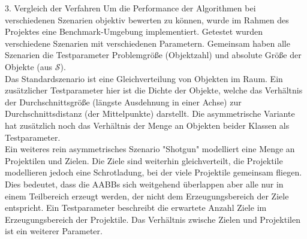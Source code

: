 3. Vergleich der Verfahren
Um die Performance der Algorithmen bei verschiedenen Szenarien objektiv bewerten zu können, wurde im Rahmen des Projektes eine Benchmark-Umgebung implementiert. Getestet wurden verschiedene Szenarien mit verschiedenen Parametern. Gemeinsam haben alle Szenarien die Testparameter Problemgröße (Objektzahl) und absolute Größe der Objekte (aus $\mathcal{S}$).\\
Das Standardszenario ist eine Gleichverteilung von Objekten im Raum. Ein zusätzlicher Testparameter hier ist die Dichte der Objekte, welche das Verhältnis der Durchschnittsgröße (längste Ausdehnung in einer Achse) zur Durchschnittsdistanz (der Mittelpunkte) darstellt. Die asymmetrische Variante hat zusätzlich noch das Verhältnis der Menge an Objekten beider Klassen als Testparameter.\\
Ein weiteres rein asymmetrisches Szenario "Shotgun" modelliert eine Menge an Projektilen und Zielen. Die Ziele sind weiterhin gleichverteilt, die Projektile modellieren jedoch eine Schrotladung, bei der viele Projektile gemeinsam fliegen. Dies bedeutet, dass die AABBs sich weitgehend überlappen aber alle nur in einem Teilbereich erzeugt werden, der nicht dem Erzeugungsbereich der Ziele entspricht. Ein Testparameter beschreibt die erwartete Anzahl Ziele im Erzeugungsbereich der Projektile. Das Verhältnis zwische Zielen und Projektilen ist ein weiterer Parameter.
